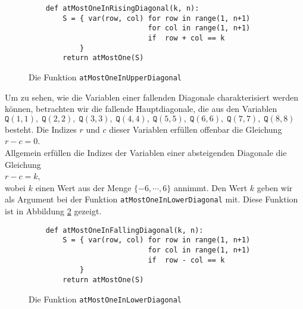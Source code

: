 \begin{figure}[!ht]
  \centering
\begin{verbatim}
    def atMostOneInRisingDiagonal(k, n):
        S = { var(row, col) for row in range(1, n+1)
                            for col in range(1, n+1) 
                            if  row + col == k 
            }
        return atMostOne(S)
\end{verbatim}
\vspace*{-0.3cm}
  \caption{Die Funktion \texttt{atMostOneInUpperDiagonal}}
  \label{fig:atMostOneInUpperDiagonal}
\end{figure}

Um zu sehen, wie die Variablen einer fallenden Diagonale
charakterisiert werden können, betrachten wir die fallende Hauptdiagonale, die aus den
Variablen \\[0.2cm]
\hspace*{1.3cm} 
$\texttt{Q}(1,1),\; \texttt{Q}(2,2),\; \texttt{Q}(3,3),\; \texttt{Q}(4,4),\; \texttt{Q}(5,5),\; 
 \texttt{Q}(6,6),\; \texttt{Q}(7,7),\; \texttt{Q}(8,8)$ 
\\[0.2cm]
besteht. Die Indizes  $r$ und $c$ dieser Variablen erfüllen offenbar
die Gleichung \\[0.2cm]
\hspace*{1.3cm} $r - c = 0$. \\[0.2cm]
Allgemein erfüllen die Indizes der Variablen einer absteigenden Diagonale die Gleichung \\[0.2cm]
\hspace*{1.3cm} $r - c = k$, \\[0.2cm]
wobei $k$ einen Wert aus der Menge $\{-6, \cdots, 6 \}$ annimmt.  Den Wert $k$ geben wir als Argument bei der
Funktion \texttt{atMostOneInLowerDiagonal} mit. Diese Funktion ist in Abbildung
\ref{fig:atMostOneInLowerDiagonal} gezeigt. 

\begin{figure}[!ht]
  \centering
\begin{verbatim}
    def atMostOneInFallingDiagonal(k, n):
        S = { var(row, col) for row in range(1, n+1)
                            for col in range(1, n+1) 
                            if  row - col == k 
            }
        return atMostOne(S)
\end{verbatim}
\vspace*{-0.3cm}
  \caption{Die Funktion \texttt{atMostOneInLowerDiagonal}}
  \label{fig:atMostOneInLowerDiagonal}
\end{figure}

